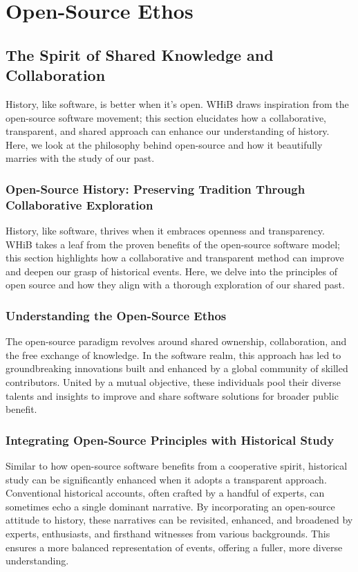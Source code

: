 \documentclass{book}
\begin{document}
\chapter{Open-Source Ethos}
\section*{The Spirit of Shared Knowledge and Collaboration}
History, like software, is better when it's open. WHiB draws inspiration from the open-source software movement; this section elucidates how a collaborative, transparent, and shared approach can enhance our understanding of history. Here, we look at the philosophy behind open-source and how it beautifully marries with the study of our past.

\subsection*{Open-Source History: Preserving Tradition Through Collaborative Exploration}
History, like software, thrives when it embraces openness and transparency. WHiB takes a leaf from the proven benefits of the open-source software model; this section highlights how a collaborative and transparent method can improve and deepen our grasp of historical events. Here, we delve into the principles of open source and how they align with a thorough exploration of our shared past.

\subsection*{Understanding the Open-Source Ethos}
The open-source paradigm revolves around shared ownership, collaboration, and the free exchange of knowledge. In the software realm, this approach has led to groundbreaking innovations built and enhanced by a global community of skilled contributors. United by a mutual objective, these individuals pool their diverse talents and insights to improve and share software solutions for broader public benefit.

\subsection*{Integrating Open-Source Principles with Historical Study}
Similar to how open-source software benefits from a cooperative spirit, historical study can be significantly enhanced when it adopts a transparent approach. Conventional historical accounts, often crafted by a handful of experts, can sometimes echo a single dominant narrative. By incorporating an open-source attitude to history, these narratives can be revisited, enhanced, and broadened by experts, enthusiasts, and firsthand witnesses from various backgrounds. This ensures a more balanced representation of events, offering a fuller, more diverse understanding.
\end{document}
